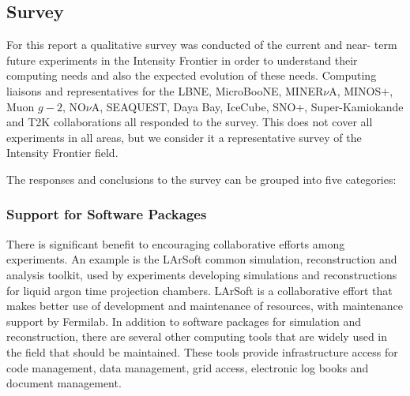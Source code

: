 \subsection{Survey}
For this report a qualitative survey was conducted of the current and near-
term future experiments in the Intensity Frontier in order to understand their computing needs
and also the expected evolution of these needs.  Computing liaisons and
representatives for the LBNE, MicroBooNE, MINER$\nu$A, MINOS$+$, Muon $g-2$,
NO$\nu$A, SEAQUEST,  Daya Bay, IceCube, SNO+, Super-Kamiokande and T2K
collaborations all responded to the survey. This does not cover all
experiments in all areas, but we consider it a representative survey of the Intensity Frontier
field.

The responses and conclusions to the survey can be grouped into five categories:  

\subsubsection{Support for Software Packages}
There is significant benefit to encouraging collaborative efforts
among experiments. An example is the LArSoft common simulation,
reconstruction and analysis toolkit, used by experiments developing
simulations and reconstructions for liquid argon time projection chambers.
LArSoft is a collaborative effort that makes better use of development and
maintenance of resources, with maintenance support by Fermilab.  In
addition to software packages for simulation and reconstruction, there are
several other computing tools that are widely used in the field that should be
maintained.  These tools provide infrastructure access for code management,
data management, grid access, electronic log books and document management.

